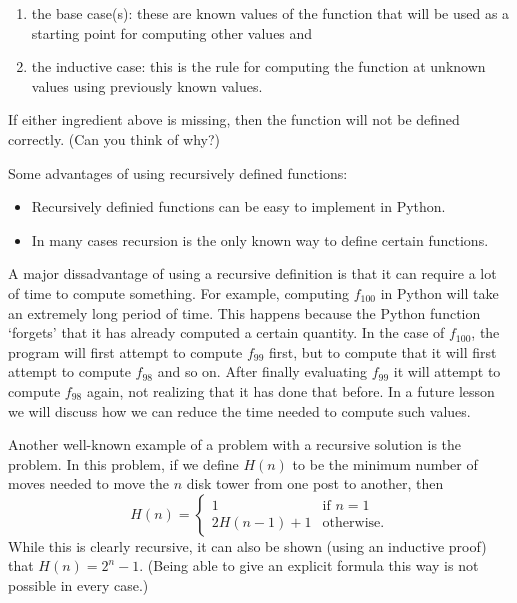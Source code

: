 \documentclass{ximera}
\begin{document}
	\begin{enumerate}
	\item the base case(s): these are known values of the function that will be used as a starting point for computing other values and 
	\item the inductive case: this is the rule for computing the function at unknown values using previously known values.
	\end{enumerate}

If either ingredient above is missing, then the function will not be defined correctly. (Can you think of why?)

Some advantages of using recursively defined functions:

	\begin{itemize}
		\item Recursively definied functions can be easy to implement in Python.
		\item In many cases recursion is the only known way to define certain functions.

	\end{itemize}

A major dissadvantage of using a recursive definition is that it can require a lot of time to compute something. For example, computing $f_{100}$ in Python will take an extremely long period of time. This happens because the Python function `forgets' that it has already computed a certain quantity. In the case of $f_{100}$, the program will first attempt to compute $f_{99}$ first, but to compute that it will first attempt to compute $f_{98}$ and so on. After finally evaluating $f_{99}$ it will attempt to compute $f_{98}$ again, not realizing that it has done that before. In a future lesson we will discuss how we can reduce the time needed to compute such values.

Another well-known example of a problem with a recursive solution is the  problem. In this problem, if we define $H(n)$ to be the minimum number of moves needed to move the $n$ disk tower from one post to another, then $$H(n) = \begin{cases}1 & \text{if $n=1$}\\ 2H(n-1) + 1 & \text{otherwise.}\end{cases}$$ While this is clearly recursive, it can also be shown (using an inductive proof) that $H(n)=2^n-1$. (Being able to give an explicit formula this way is not possible in every case.)
\end{document}
